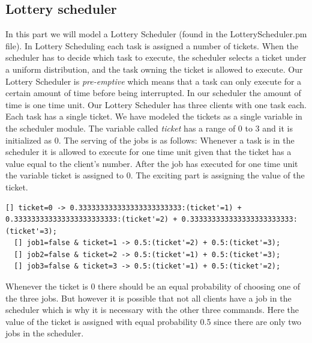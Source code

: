 \documentclass[12pt]{report}
\begin{document}
\subsection*{Lottery scheduler}
In this part we will model a Lottery Scheduler (found in the LotteryScheduler.pm file). In Lottery Scheduling each task is assigned a number of tickets. When the scheduler has to decide which task to execute, the scheduler selects a ticket under a uniform distribution, and the task owning the ticket is allowed to execute. Our Lottery Scheduler is \emph{pre-emptive} which means that a task can only execute for a certain amount of time before being interrupted. In our scheduler the amount of time is one time unit.  Our Lottery Scheduler has three clients with one task each. Each task has a single ticket. We have modeled the tickets as a single variable in the scheduler module. The variable called \emph{ticket} has a range of 0 to 3 and it is initialized as 0. The serving of the jobs is as follows: Whenever a task is in the scheduler it is allowed to execute for one time unit given that the ticket has a value equal to the client's number. After the job has executed for one time unit the variable ticket is assigned to 0. The exciting part is assigning the value of the ticket.

\begin{lstlisting}[style=prismmodel]
  [] ticket=0 -> 0.333333333333333333333333:(ticket'=1) + 0.333333333333333333333333:(ticket'=2) + 0.333333333333333333333333:(ticket'=3);
  [] job1=false & ticket=1 -> 0.5:(ticket'=2) + 0.5:(ticket'=3);
  [] job2=false & ticket=2 -> 0.5:(ticket'=1) + 0.5:(ticket'=3);
  [] job3=false & ticket=3 -> 0.5:(ticket'=1) + 0.5:(ticket'=2);
\end{lstlisting}
Whenever the ticket is 0 there should be an equal probability of choosing one of the three jobs. But however it is possible that not all clients have a job in the scheduler which is why it is necessary with the other three commands. Here the value of the ticket is assigned with equal probability 0.5 since there are only two jobs in the scheduler.\\
\end{document}
